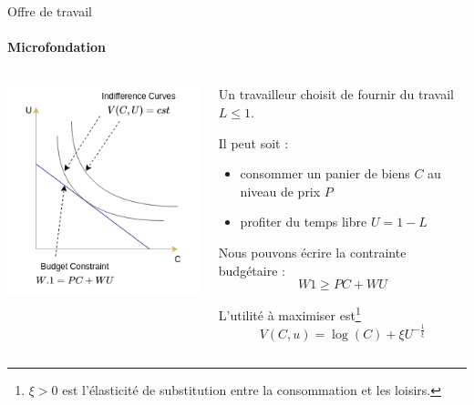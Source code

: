 \documentclass[
  ignorenonframetext,
  aspectratio=169,
]{beamer}
\providecommand{\tightlist}{%
  \setlength{\itemsep}{0pt}\setlength{\parskip}{0pt}}\usepackage{longtable,booktabs,array}
\begin{document}
\begin{frame}{Offre de travail}
\label{offre-de-travail}
\framesubtitle{Microfondation}

\begin{columns}[T]
\begin{column}{0.4\textwidth}
\includegraphics{assets/optimization.png}
\end{column}

\begin{column}{0.6\textwidth}
Un travailleur choisit de fournir du travail \(L\leq 1\).

Il peut soit :

\begin{itemize}
\tightlist
\item
  consommer un panier de biens \(C\) au niveau de prix \(P\)
\item
  profiter du temps libre \(U=1-L\)
\end{itemize}

Nous pouvons écrire la contrainte budgétaire : \[W 1 \geq P C + W U\]

L'utilité à maximiser
est\footnote{$\xi>0$ est l'élasticité de substitution entre la consommation et les loisirs.}\[V(C,u) = \log(C) + \xi U^{-\frac{1}{\xi}}\]
\end{column}
\end{columns}
\end{frame}
\end{document}
